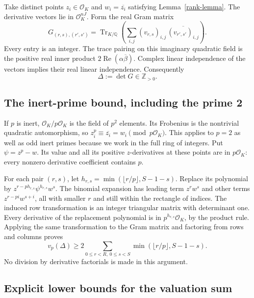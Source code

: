 \documentclass[11pt]{article}
\newcommand{\Z}{\mathbb Z}
\newcommand{\Q}{\mathbb Q}
\newcommand{\OK}{\mathcal O_K}
\newcommand{\Tr}{\operatorname{Tr}}
\begin{document}
Take distinct points \(z_i\in\OK\) and \(w_i=\overline{z_i}\) satisfying
Lemma~\ref{rank-lemma}. The derivative vectors lie in \(\OK^{nJ}\).
Form the real Gram matrix
\[
 G_{(r,s),(r',s')}=
 \Tr_{K/\Q}\!\left(\sum_{i,j}
 (v_{r,s})_{i,j}\,\overline{(v_{r',s'})_{i,j}}\right).
\]
Every entry is an integer. The trace pairing on this imaginary
quadratic field is the positive real inner product
\(2\operatorname{Re}(\alpha\overline\beta)\). Complex linear
independence of the vectors implies their real linear independence.
Consequently
\begin{equation}\label{positive-det}
 \Delta:=\det G\in\Z_{>0}.
\end{equation}

\subsection{The inert-prime bound, including the prime 2}

If \(p\) is inert, \(\OK/p\OK\) is the field of \(p^2\) elements.
Its Frobenius is the nontrivial quadratic automorphism, so
\(z_i^p\equiv\overline{z_i}=w_i\pmod{p\OK}\).
This applies to \(p=2\) as well as odd inert primes because we work
in the full ring of integers. Put \(\psi=z^p-w\).
Its value and all its positive \(z\)-derivatives at these points are
in \(p\OK\): every nonzero derivative coefficient contains \(p\).

For each pair \((r,s)\), let
\(h_{r,s}=\min(\lfloor r/p\rfloor,S-1-s)\).
Replace its polynomial by
\(z^{r-ph_{r,s}}\psi^{h_{r,s}}w^s\).
The binomial expansion has leading term \(z^r w^s\) and other terms
\(z^{r-pi}w^{s+i}\), all with smaller \(r\) and still within the
rectangle of indices. The induced row transformation is an integer
triangular matrix with determinant one. Every derivative of the
replacement polynomial is in \(p^{h_{r,s}}\OK\), by the product rule.
Applying the same transformation to the Gram matrix and factoring
from rows and columns proves
\begin{equation}\label{valuation}
 v_p(\Delta)\ge
 2\sum_{0\le r<R,\ 0\le s<S}\min(\lfloor r/p\rfloor,S-1-s).
\end{equation}
No division by derivative factorials is made in this argument.

\subsection{Explicit lower bounds for the valuation sum}
\end{document}
